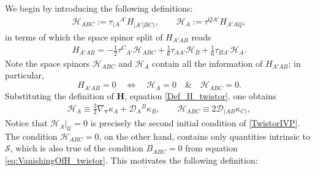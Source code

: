 \documentclass[10pt,a4paper]{article}
\theoremstyle{plain}
\def\bmH{{\bm H}}
\begin{document}
We begin by introducing the following definitions:
\begin{align}
  \mathcal{H} _{ABC} := \tau _{(A}{}^{A'}H_{|A'|BC)}, \qquad
  \mathcal{H}_{A} := \tau^{QA'} H_{A'AQ},
\end{align}
in terms of which the space spinor split of $H_{A'AB}$ reads
\begin{align}
  H_{A'AB} = - \tfrac{1}{2} \tau ^{C}{}_{A'} \mathcal{H} _{ABC} +
  \tfrac{1}{6} \tau_{AA'} \mathcal{H}_{B} + \tfrac{1}{6} \tau_{BA'}
  \mathcal{H}_{A}.
\end{align}
Note the space spinors $\mathcal{H} _{ABC}$ and $\mathcal{H}_{A}$
contain all the information of $H_{A'AB}$; in particular,
\[
H_{A'AB}=0 \quad                 
\iff \quad \mathcal{H} _{A}=0    
\quad
\& \quad \mathcal{H}_{ABC}=0.  
\]
Substituting the definition of $\bmH$, equation \eqref{Def_H_twistor},
one obtains
\begin{align}\label{spacespinordecompHtotwistorders}
\mathcal{H} _{A} \equiv \tfrac{3}{2} \nabla_{\bm\tau} \kappa_{A} +
\mathcal{D} _{A}{}^B\kappa_{B}, \qquad \mathcal{H} _{ABC} \equiv 2
\mathcal{D} _{(AB}\kappa _{C)},
\end{align}
Notice that $\mathcal{H}_A|_{\mathcal{U}}=0$ is precisely the second
initial condition of \eqref{TwistorIVP}. The condition
$\mathcal{H}_{ABC}=0$, on the other hand, contains only quantities
intrinsic to $\mathcal{S}$, which is also true of the condition
$B_{ABC}=0$ from equation \eqref{eq:VanishingOfH_twistor}.
This motivates the following definition:
\end{document}

